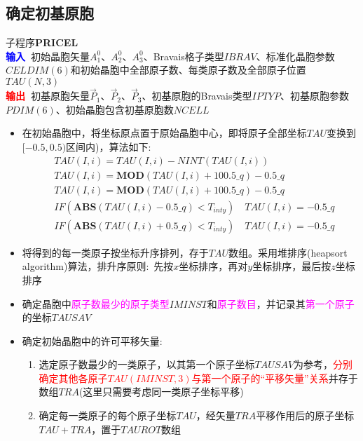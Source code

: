 \subsection{确定初基原胞}
子程序\textbf{PRICEL}\\
\textbf{\textcolor{blue}{输入~}}初始晶胞矢量$A^0_1$、$A^0_2$、$A^0_3$、\textrm{Bravais}格子类型$\mathit{IBRAV}$、标准化晶胞参数$\mathit{CELDIM}(6)$和初始晶胞中全部原子数、每类原子数及全部原子位置$\mathit{TAU}(N,3)$\\
\textbf{\textcolor{red}{输出~}}初基原胞矢量$\vec P_1$、$\vec P_2$、$\vec P_3$、初基原胞的\textrm{Bravais}类型$\mathit{IPTYP}$、初基原胞参数$\mathit{PDIM}(6)$、初始晶胞包含初基原胞数$\mathit{NCELL}$
\begin{itemize}
	\item 在初始晶胞中，将坐标原点置于原始晶胞中心，即将原子全部坐标$\mathit{TAU}$变换到$[-0.5,0.5)$区间内)，算法如下:
			\begin{displaymath}
				\begin{aligned}
					&TAU(I,i)=TAU(I,i)-NINT(TAU(I,i)) \\
					&TAU(I,i)=\mathbf{MOD}(TAU(I,i)+100.5\_q)-0.5\_q \\
					&TAU(I,i)=\mathbf{MOD}(TAU(I,i)+100.5\_q)-0.5\_q \\
					&IF (\mathbf{ABS}(TAU(I,i)-0.5\_q)<T_{inty})\quad TAU(I,i)=-0.5\_q \\
					&IF (\mathbf{ABS}(TAU(I,i)+0.5\_q)<T_{inty})\quad TAU(I,i)=-0.5\_q
				\end{aligned}
			\end{displaymath}
	\item 将得到的每一类原子按坐标升序排列，存于$\mathit{TAU}$数组。采用堆排序\textrm{(heapsort algorithm)}算法，排升序原则:~先按$x$坐标排序，再对$y$坐标排序，最后按$z$坐标排序
	\item 确定晶胞中\textcolor{magenta}{原子数最少的原子类型}$\mathit{IMINST}$和\textcolor{magenta}{原子数目}，并记录其\textcolor{magenta}{第一个原子}的坐标$\mathit{TAUSAV}$
	\item 确定初始晶胞中的许可平移矢量:~
		\begin{enumerate}
			\item 选定原子数最少的一类原子，以其第一个原子坐标$\mathit{TAUSAV}$为参考，\textcolor{red}{分别确定其他各原子$\mathit{TAU}(IMINST,3)$与第一个原子的“平移矢量”关系}并存于数组$\mathit{TRA}$(这里只需要考虑同一类原子坐标平移)
			\item 确定每一类原子的每个原子坐标$\mathit{TAU}$，经矢量$\mathit{TRA}$平移作用后的原子坐标$\mathit{TAU}+\mathit{TRA}$，置于$\mathit{TAUROT}$数组

\end{enumerate}
\end{itemize}

